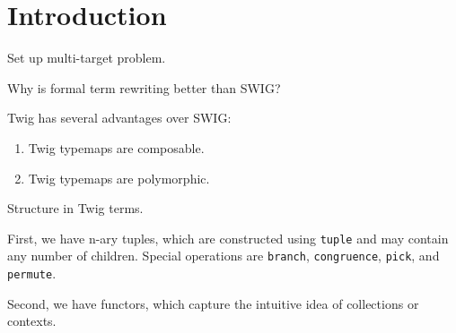 
\section{Introduction}

Set up multi-target problem.

Why is formal term rewriting better than SWIG?

Twig has several advantages over SWIG:

\begin{enumerate}
\item Twig typemaps are composable.
\item Twig typemaps are polymorphic.
\end{enumerate}

Structure in Twig terms.

First, we have n-ary tuples, which are constructed using \texttt{tuple} and may
contain any number of children. Special operations are \texttt{branch},
\texttt{congruence}, \texttt{pick}, and \texttt{permute}.

Second, we have functors, which capture the intuitive idea of collections or
contexts.

%
% 
%     

